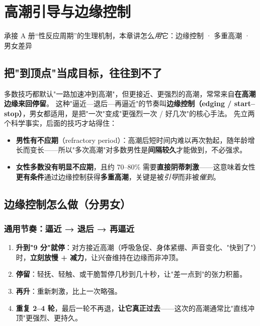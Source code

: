 
\chapter{高潮引导与边缘控制}

\begin{center}
\myhei\large 承接 A 册“性反应周期”的生理机制，本章讲怎么\emph{用}它：边缘控制 · 多重高潮 · 男女差异
\end{center}

\section{把"到顶点"当成目标，往往到不了}
多数技巧都默认"一路加速冲到高潮"，但更接近、更强烈的高潮，常常来自\textbf{在高潮边缘来回停留}。
这种"逼近—退后—再逼近"的节奏叫\textbf{边缘控制（edging / start--stop）}，男女都适用，是把"一次"变成"更强烈一次 / 好几次"的核心手法。
先立两个科学事实，后面的技巧才站得住：

\begin{itemize}[leftmargin=2em,itemsep=0.3em]
  \item \textbf{男性有不应期}（refractory period）：高潮后短时间内难以再次勃起，随年龄增长而变长——所以"多次高潮"对多数男性是\textbf{间隔较久}才能做到，不必强求。
  \item \textbf{女性多数没有明显不应期}，且约 70--80\% 需要\textbf{直接阴蒂刺激}——这意味着女性\textbf{更有条件}通过边缘控制获得\textbf{多重高潮}，关键是被\emph{引导}而非被\emph{催到}。
\end{itemize}

\section{边缘控制怎么做（分男女）}
\subsection*{通用节奏：逼近 → 退后 → 再逼近}
\begin{enumerate}[leftmargin=2em,itemsep=0.3em]
  \item \textbf{升到"9 分"就停}：对方接近高潮（呼吸急促、身体紧绷、声音变化、"快到了"）时，\textbf{立刻放慢 + 减力}，让兴奋维持在边缘而非冲顶。
  \item \textbf{停留}：轻抚、轻触、或干脆暂停几秒到几十秒，让"差一点到"的张力积蓄。
  \item \textbf{再升}：重新刺激，比上一次略强。
  \item \textbf{重复 2--4 轮}，最后一轮不再退，\textbf{让它真正过去}——这次的高潮通常比"直线冲顶"更强烈、更持久。
\end{enumerate}

